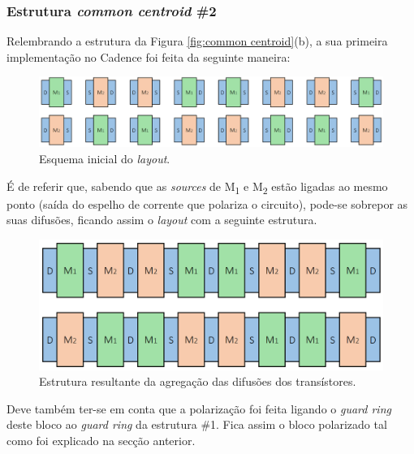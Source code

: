 \documentclass[11pt]{article}
\numberwithin{equation}{section}
\begin{document}
\subsubsection{Estrutura \textit{common centroid} \#2}

Relembrando a estrutura da Figura \ref{fig:common centroid}(b), a sua primeira implementação no Cadence foi feita da seguinte maneira:

\begin{figure}[H]
	\centering
	\includegraphics[keepaspectratio=true, scale=0.28]{teoricas/layout/cc2_1}
	\vspace{-0.5em}
	\caption{Esquema inicial do \textit{layout}.}
	\vspace{-0.8em} 
\end{figure}

É de referir que, sabendo que as \textit{sources} de M\textsubscript{1} e M\textsubscript{2} estão ligadas ao mesmo ponto (saída do espelho de corrente que polariza o circuito), pode-se sobrepor as suas difusões, ficando assim o \textit{layout} com a seguinte estrutura.

\begin{figure}[H]
	\centering
	\includegraphics[keepaspectratio=true, scale=0.28]{teoricas/layout/cc2_2}
	\vspace{-0.5em}
	\caption{Estrutura resultante da agregação das difusões dos transístores.}
	\vspace{-0.8em} 
\end{figure}

Deve também ter-se em conta que a polarização foi feita ligando o \textit{guard ring} deste bloco ao \textit{guard ring} da estrutura \#1. Fica assim o bloco polarizado tal como foi explicado na secção anterior.
\end{document}

